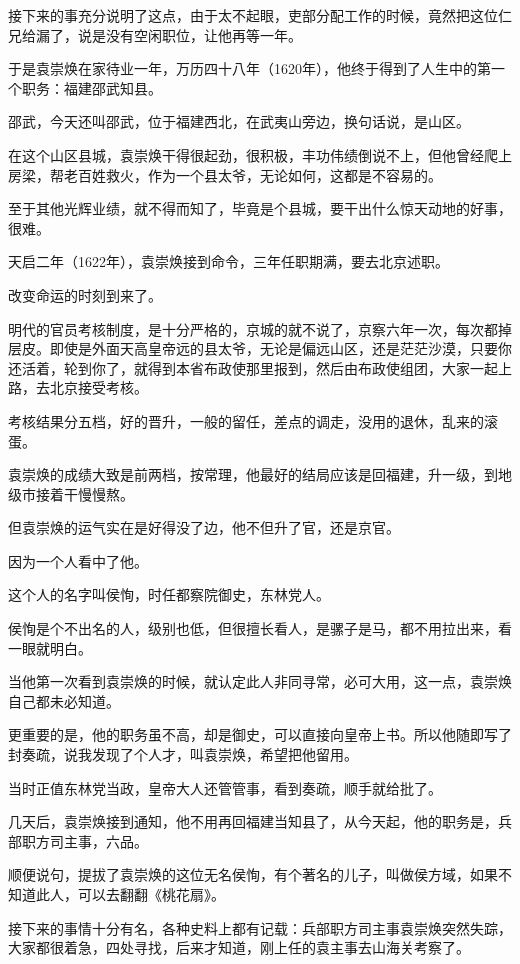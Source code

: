 \begin{multicols}{\theparacolNo}
接下来的事充分说明了这点，由于太不起眼，吏部分配工作的时候，竟然把这位仁兄给漏了，说是没有空闲职位，让他再等一年。

于是袁崇焕在家待业一年，万历四十八年（1620年），他终于得到了人生中的第一个职务：福建邵武知县。

邵武，今天还叫邵武，位于福建西北，在武夷山旁边，换句话说，是山区。

在这个山区县城，袁崇焕干得很起劲，很积极，丰功伟绩倒说不上，但他曾经爬上房梁，帮老百姓救火，作为一个县太爷，无论如何，这都是不容易的。

至于其他光辉业绩，就不得而知了，毕竟是个县城，要干出什么惊天动地的好事，很难。

天启二年（1622年），袁崇焕接到命令，三年任职期满，要去北京述职。

改变命运的时刻到来了。

明代的官员考核制度，是十分严格的，京城的就不说了，京察六年一次，每次都掉层皮。即使是外面天高皇帝远的县太爷，无论是偏远山区，还是茫茫沙漠，只要你还活着，轮到你了，就得到本省布政使那里报到，然后由布政使组团，大家一起上路，去北京接受考核。

考核结果分五档，好的晋升，一般的留任，差点的调走，没用的退休，乱来的滚蛋。

袁崇焕的成绩大致是前两档，按常理，他最好的结局应该是回福建，升一级，到地级市接着干慢慢熬。

但袁崇焕的运气实在是好得没了边，他不但升了官，还是京官。

因为一个人看中了他。

这个人的名字叫侯恂，时任都察院御史，东林党人。

侯恂是个不出名的人，级别也低，但很擅长看人，是骡子是马，都不用拉出来，看一眼就明白。

当他第一次看到袁崇焕的时候，就认定此人非同寻常，必可大用，这一点，袁崇焕自己都未必知道。

更重要的是，他的职务虽不高，却是御史，可以直接向皇帝上书。所以他随即写了封奏疏，说我发现了个人才，叫袁崇焕，希望把他留用。

当时正值东林党当政，皇帝大人还管管事，看到奏疏，顺手就给批了。

几天后，袁崇焕接到通知，他不用再回福建当知县了，从今天起，他的职务是，兵部职方司主事，六品。

顺便说句，提拔了袁崇焕的这位无名侯恂，有个著名的儿子，叫做侯方域，如果不知道此人，可以去翻翻《桃花扇》。

接下来的事情十分有名，各种史料上都有记载：兵部职方司主事袁崇焕突然失踪，大家都很着急，四处寻找，后来才知道，刚上任的袁主事去山海关考察了。


\end{multicols}
